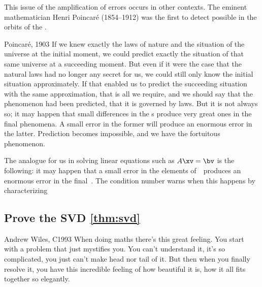 This issue of the amplification of errors occurs in other contexts.
The eminent mathematician  Henri Poincar\'e (1854--1912) was the first to detect possible  in the orbits of the .
\begin{quoted}{Poincar\'e, 1903}
If we knew exactly the laws of nature and the situation of the universe at the initial moment, we could predict exactly the situation of that same universe at a succeeding moment.
But even if it were the case that the natural laws had no longer any secret for us, we could still only know the initial situation approximately. 
If that enabled us to predict the succeeding situation with the same approximation, that is all we require, and we should say that the phenomenon had been predicted, that it is governed by laws. 
But it is not always so; it may happen that small differences in the s produce very great ones in the final phenomena. 
A small error in the former will produce an enormous error in the latter. 
Prediction becomes impossible, and we have the fortuitous phenomenon.
\end{quoted}
The analogue for us in solving linear equations such as \(A\xv=\bv\) is the following: it may happen that a small error in the elements of~\bv\ produces an enormous error in the final~\xv.
The condition number warns when this happens by characterizing 






\subsection{Prove the SVD \cref{thm:svd}}
\label{sec:psvdt}



\begin{quoted}{Andrew Wiles, C1993}
When doing maths there's this great feeling.
You start with a problem that just mystifies you.
You can't understand it, it's so complicated, you just can't make head nor tail of it.
But then when you finally resolve it, you have this incredible feeling of how beautiful it is, how it all fits together so elegantly.
\end{quoted}


